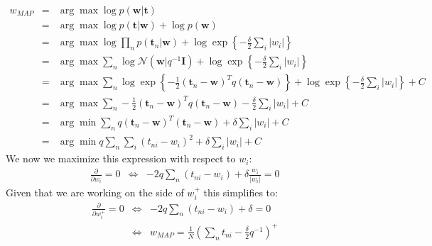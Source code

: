 \documentclass[a4paper, 11pt]{article}
\begin{document}
\begin{eqnarray}
w_{MAP} &=& \arg \max \log p(\mathbf{w} |  \mathbf{t}) \nonumber \\
&=& \arg \max \log p(\mathbf{t} | \mathbf{w}) + \log p(\mathbf{w}) \nonumber \\
&=& \arg \max \log \prod_{n} p(\mathbf{t}_n | \mathbf{w}) + \log \exp \left\lbrace -\frac{\delta}{2} \sum_i |w_i|  \right\rbrace \nonumber \\
&=&  \arg \max \sum_{n} \log \mathcal{N}(\mathbf{w} | q^{-1} \mathbf{I}) + \log \exp \left\lbrace -\frac{\delta}{2} \sum_i |w_i|  \right\rbrace\nonumber \\
&=& \arg \max \sum_{n} \log \exp \left\lbrace -\frac{1}{2} (\mathbf{t}_n - \mathbf{w})^T q (\mathbf{t}_n - \mathbf{w}) \right\rbrace + \log \exp \left\lbrace -\frac{\delta}{2} \sum_i |w_i|  \right\rbrace + C \nonumber \\
&=& \arg \max \sum_{n} -\frac{1}{2} (\mathbf{t}_n - \mathbf{w})^T q (\mathbf{t}_n - \mathbf{w}) -\frac{\delta}{2} \sum_i |w_i| + C \nonumber \\
&=& \arg \min \sum_{n} q (\mathbf{t}_n - \mathbf{w})^T (\mathbf{t}_n - \mathbf{w}) + \delta \sum_i |w_i| + C \nonumber \\
&=& \arg \min q \sum_{n} \sum_{i} (t_{ni} - w_i)^2 + \delta \sum_i |w_i| + C \nonumber
\end{eqnarray}
We now we maximize this expression with respect to $w_i$:
\begin{eqnarray}
\frac{\partial}{\partial w_{i}} = 0 &\Leftrightarrow& -2 q \sum_{n} (t_{ni} - w_{i}) + \delta \frac{w_i}{|w_i|} = 0 \nonumber
\end{eqnarray}
Given that we are working on the side of $w_{i}^{+}$ this simplifies to:
\begin{eqnarray}
\frac{\partial}{\partial w_{i}^{+}} = 0 &\Leftrightarrow& -2 q \sum_{n} (t_{ni} - w_{i}) + \delta = 0  \nonumber \\
&\Leftrightarrow&w_{MAP} = \frac{1}{N} \left( \sum_n t_{ni} - \frac{\delta}{2} q^{-1} \right)^+ \nonumber
\end{eqnarray}
\end{document}
